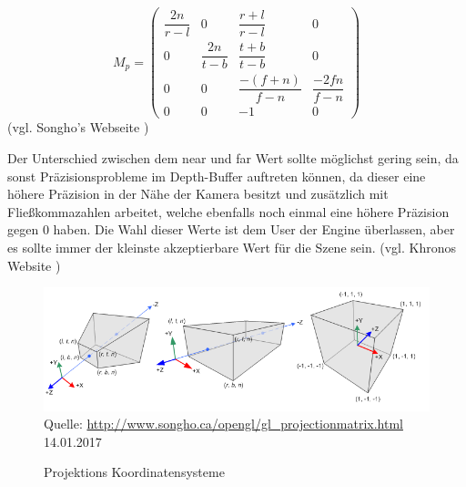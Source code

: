 $$ M_{p} = \begin{pmatrix}
\dfrac{2n}{r-l} & 0 & \dfrac{r+l}{r-l} & 0 \\
0 & \dfrac{2n}{t-b} & \dfrac{t+b}{t-b} & 0 \\
0 & 0 & \dfrac{-(f+n)}{f-n} & \dfrac{-2fn}{f-n} \\
0 & 0 & -1 & 0
\end{pmatrix} $$
(vgl. Songho's Webseite \cite{ProjectionMatrixWeb})

Der Unterschied zwischen dem near und far Wert sollte möglichst gering sein, da sonst Präzisionsprobleme im Depth-Buffer auftreten können, da dieser eine höhere Präzision in der Nähe der Kamera besitzt und zusätzlich mit Fließkommazahlen arbeitet, welche ebenfalls noch einmal eine höhere Präzision gegen 0 haben. Die Wahl dieser Werte ist dem User der Engine überlassen, aber es sollte immer der kleinste akzeptierbare Wert für die Szene sein. (vgl. Khronos Website \cite{DepthProblem})

\begin{figure}[h]
	\centering
	\includegraphics[width=\textwidth]{02theorie/projektionen.png}
	Quelle: \url{http://www.songho.ca/opengl/gl_projectionmatrix.html}	
	14.01.2017
	\caption{Projektions Koordinatensysteme}\label{img:projection}
\end{figure}
